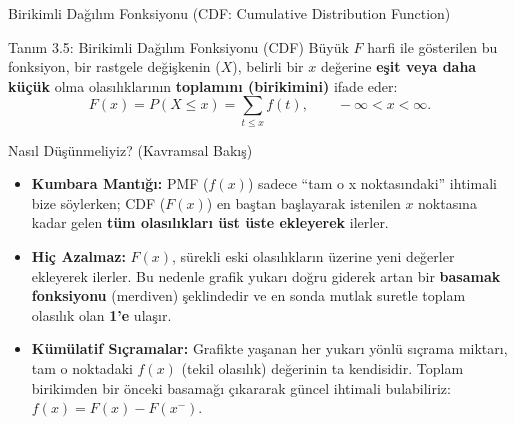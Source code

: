 ﻿\documentclass[light]{lutbeamer}
\begin{document}
\begin{frame}{Birikimli Dağılım Fonksiyonu (CDF: Cumulative Distribution Function)}
    \small
    \begin{block}{Tanım 3.5: Birikimli Dağılım Fonksiyonu (CDF)}
        Büyük $F$ harfi ile gösterilen bu fonksiyon, bir rastgele değişkenin ($X$), belirli bir $x$ değerine \textbf{eşit veya daha küçük} olma olasılıklarının \textbf{toplamını (birikimini)} ifade eder:
        \[
        F(x) = P(X \le x) = \sum_{t \le x} f(t), \qquad -\infty < x < \infty.
        \]
    \end{block}

    \begin{exampleblock}{Nasıl Düşünmeliyiz? (Kavramsal Bakış)}
        \begin{itemize}
            \item \textbf{Kumbara Mantığı:} PMF ($f(x)$) sadece ``tam o x noktasındaki'' ihtimali bize söylerken; CDF ($F(x)$) en baştan başlayarak istenilen $x$ noktasına kadar gelen \textbf{tüm olasılıkları üst üste ekleyerek} ilerler.
            \item \textbf{Hiç Azalmaz:} $F(x)$, sürekli eski olasılıkların üzerine yeni değerler ekleyerek ilerler. Bu nedenle grafik yukarı doğru giderek artan bir \textbf{basamak fonksiyonu} (merdiven) şeklindedir ve en sonda mutlak suretle toplam olasılık olan \textbf{1'e} ulaşır.
            \item \textbf{Kümülatif Sıçramalar:} Grafikte yaşanan her yukarı yönlü  sıçrama miktarı, tam o noktadaki $f(x)$ (tekil olasılık) değerinin ta kendisidir. Toplam birikimden bir önceki basamağı çıkararak güncel ihtimali bulabiliriz: $f(x) = F(x) - F(x^{-})$.
        \end{itemize}
    \end{exampleblock}
\end{frame}
\end{document}
